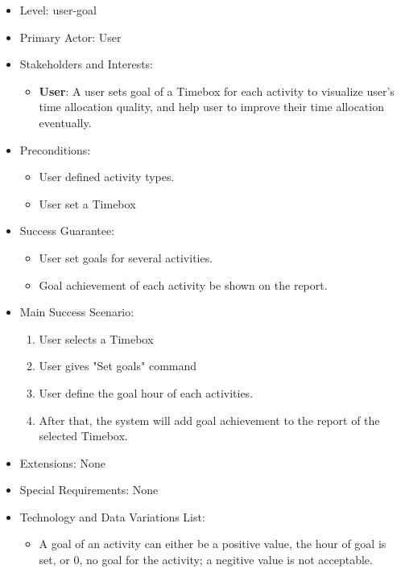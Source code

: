 \documentclass[12pt, a4paper]{article}
\begin{document}
\begin{CJK*}{UTF8}{bkai}
\begin{enumerate}
\begin{itemize}
          \item Level: user-goal
          \item Primary Actor: User
          \item Stakeholders and Interests:
            \begin{itemize}
              \item {\bf User}: A user sets goal of a Timebox for each activity to visualize user's time allocation quality, and help user to improve their time allocation eventually.
            \end{itemize}
          \item Preconditions:
            \begin{itemize}
              \item User defined activity types.
              \item User set a Timebox
            \end{itemize}
          \item Success Guarantee:
            \begin{itemize}
              \item User set goals for several activities.
              \item Goal achievement of each activity be shown on the report.
            \end{itemize}
          \item Main Success Scenario:
            \begin{enumerate}
              \item User selects a Timebox
              \item User gives "Set goals" command
              \item User define the goal hour of each activities.
              \item After that, the system will add goal achievement to the report of the selected Timebox.
            \end{enumerate}
          \item Extensions: None
          \item Special Requirements: None
          \item Technology and Data Variations List:
            \begin{itemize}
              \item A goal of an activity can either be a positive value, the hour of goal is set, or 0, no goal for the activity; a negitive value is not acceptable.
            \end{itemize}

\end{itemize}
\end{enumerate}
\end{CJK*}
\end{document}
